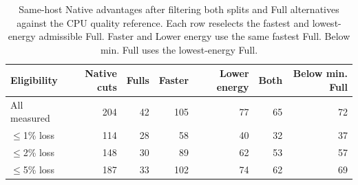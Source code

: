 \begin{table}[!htb]
\centering\small\setlength{\tabcolsep}{3pt}
\caption{Same-host Native advantages after filtering both splits and Full alternatives against the CPU quality reference. Each row reselects the fastest and lowest-energy admissible Full. Faster and Lower energy use the same fastest Full. Below min. Full uses the lowest-energy Full.}
\label{tab:evaluation:quality_tolerance}

\begin{tabular}{@{}lrrrrrr@{}}
\toprule
Eligibility & Native cuts & Fulls & Faster & Lower energy & Both & Below min. Full \\
\midrule
All measured & 204 & 42 & 105 & 77 & 65 & 72 \\
$\leq$1\% loss & 114 & 28 & 58 & 40 & 32 & 37 \\
$\leq$2\% loss & 148 & 30 & 89 & 62 & 53 & 57 \\
$\leq$5\% loss & 187 & 33 & 102 & 74 & 62 & 69 \\
\bottomrule
\end{tabular}
\end{table}
